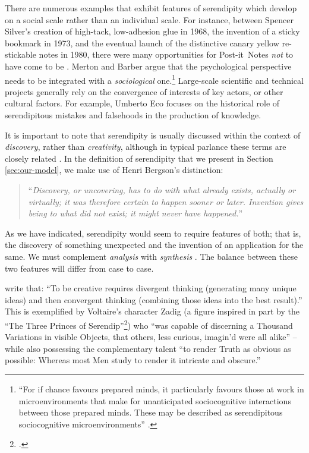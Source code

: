 There are numerous examples that exhibit features of
serendipity which develop on a social scale rather than an individual
scale.  For instance, between Spencer Silver's creation of high-tack,
low-adhesion glue in 1968, the invention of a sticky bookmark in 1973,
and the eventual launch of the distinctive canary yellow re-stickable
notes in 1980, there were many opportunities for
Post-it\texttrademark\ Notes \emph{not} to have come to be
\cite{tce-postits}.  Merton and Barber argue that the
psychological perspective needs to be integrated with a
\emph{sociological} one.\footnote{ ``For if chance favours prepared
  minds, it particularly favours those at work in microenvironments
  that make for unanticipated sociocognitive interactions between
  those prepared minds. These may be described as serendipitous
  sociocognitive microenvironments'' \cite[p. 259--260]{merton}.}
Large-scale scientific and technical projects generally rely on the
convergence of interests of key actors, or other cultural factors.
For example, Umberto Eco \citeyear{eco2013serendipities} focuses on the
historical role of serendipitous mistakes and falsehoods in the
production of knowledge.

It is important to note that serendipity is usually discussed within
the context of \emph{discovery}, rather than \emph{creativity},
although in typical parlance these terms are closely related
\cite{jordanous12jims}.  In the definition of serendipity that we present in Section \ref{sec:our-model}, we make use
of Henri Bergson's distinction:
\begin{quote}
``\emph{Discovery, or uncovering, has to do with what already exists,
    actually or virtually; it was therefore certain to happen sooner
    or later.  Invention gives being to what did not exist; it might
    never have happened.}''~\cite{bergson2010creative}
\end{quote}
As we have indicated, serendipity would seem to require features of
both; that is, the discovery of something unexpected and the invention
of an application for the same.  We must complement \emph{analysis}
with \emph{synthesis} \cite{delanda1993virtual}.  The balance between
these two features will differ from case to case.

 write that: ``To be creative requires
divergent thinking (generating many unique ideas) and then convergent
thinking (combining those ideas into the best result).''  This is
exemplified by Voltaire's \citeyear{zadig} character Zadig (a figure
inspired in part by the ``The Three Princes of
Serendip''\footnote{.}) who ``was capable of
discerning a Thousand Variations in visible Objects, that others, less
curious, imagin’d were all alike'' -- while also possessing the
complementary talent ``to render Truth as obvious as possible: Whereas
most Men study to render it intricate and obscure.''
